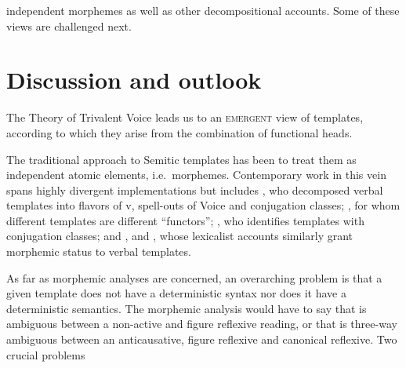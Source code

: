 \begin{exe}
\begin{xlist}
\begin{xlist}
\begin{exe}
\begin{xlist}
\begin{xlist}
\begin{exe}
\begin{xlist}
\begin{xlist}
\begin{exe}
\begin{exe}
\begin{xlist}
\begin{exe}
\begin{exe}
\begin{xlist}
\begin{exe}
\begin{exe}
\begin{exe}
\begin{exe}
\begin{exe}
\begin{xlist}
\begin{exe}
\begin{xlist}
\begin{exe}
\begin{exe}
\begin{xlist}
\begin{exe}
\begin{xlist}
\begin{exe}
\begin{xlist}
\begin{exe}
\begin{exe}
\begin{exe}
\begin{xlist}
\begin{exe}
\begin{exe}
\begin{exe}
\begin{xlist}
\begin{exe}
\begin{xlist}
\begin{exe}
\begin{xlist}
\begin{exe}
\begin{xlist}
\begin{exe}
\begin{exe}
\begin{exe}
\begin{exe}
\begin{xlist}
\begin{exe}
\begin{xlist}
\begin{exe}
\begin{xlist}
\begin{exe}
\begin{xlist}
\begin{exe}
\begin{xlist}
\begin{exe}
\begin{xlist}
\begin{exe}
\begin{exe}
\begin{exe}
\begin{exe}
\begin{xlist}
\begin{exe}
\begin{xlist}
\begin{exe}
\begin{xlist}
\begin{exe}
\begin{exe}
\begin{xlist}
\begin{exe}
\begin{xlist}
\begin{exe}
\begin{exe}
\begin{exe}
\begin{exe}
\begin{xlist}
\begin{xlist}
\begin{exe}
\begin{xlist}
\begin{exe}
\begin{exe}
\begin{exe}
\begin{xlist}
\begin{exe}
\begin{exe}
\begin{xlist}
\begin{exe}
\begin{exe}
\begin{exe}
\begin{xlist}
\begin{xlist}
\begin{exe}
\begin{xlist}
\begin{exe}
\begin{exe}
\begin{exe}
\begin{exe}
\begin{xlist}
\begin{exe}
\begin{xlist}
\begin{exe}
\begin{xlist}
\begin{exe}
\begin{xlist}
\begin{exe}
\begin{exe}
\begin{exe}
\begin{exe}
\begin{exe}
\begin{exe}
\begin{xlist}
\begin{exe}
\begin{xlist}
\begin{exe}
\begin{xlist}
\begin{exe}
\begin{xlist}
\begin{exe}
\begin{xlist}
independent morphemes as well as other decompositional accounts. Some of these views are challenged next.


\section{Discussion and outlook} \label{vz:others}
The Theory of Trivalent Voice leads us to an \textsc{emergent} view of templates, according to which they arise from the combination of functional heads.

The traditional approach to Semitic templates has been to treat them as independent atomic elements, i.e.~morphemes. Contemporary work in this vein spans highly divergent implementations but includes \cite{arad03,arad05}, who decomposed verbal templates into flavors of v, spell-outs of Voice and conjugation classes; \cite{borer13oup}, for whom different templates are different ``functors''; \cite{aronoff94,aronoff07}, who identifies templates with conjugation classes; and \cite{reinhartsiloni05}, \cite{schwarzwald08} and \cite{laks11,laks14}, whose lexicalist accounts similarly grant morphemic status to verbal templates.

As far as morphemic analyses are concerned, an overarching problem is that a given template does not have a deterministic syntax nor does it have a deterministic semantics. The morphemic analysis would have to say that {\tnif} is ambiguous between a non-active and figure reflexive reading, or that {\thit} is three-way ambiguous between an anticausative, figure reflexive and canonical reflexive. Two crucial problems 
\end{xlist}
\end{exe}
\end{xlist}
\end{exe}
\end{xlist}
\end{exe}
\end{xlist}
\end{exe}
\end{xlist}
\end{exe}
\end{exe}
\end{exe}
\end{exe}
\end{exe}
\end{exe}
\end{xlist}
\end{exe}
\end{xlist}
\end{exe}
\end{xlist}
\end{exe}
\end{xlist}
\end{exe}
\end{exe}
\end{exe}
\end{exe}
\end{xlist}
\end{exe}
\end{xlist}
\end{xlist}
\end{exe}
\end{exe}
\end{exe}
\end{xlist}
\end{exe}
\end{exe}
\end{xlist}
\end{exe}
\end{exe}
\end{exe}
\end{xlist}
\end{exe}
\end{xlist}
\end{xlist}
\end{exe}
\end{exe}
\end{exe}
\end{exe}
\end{xlist}
\end{exe}
\end{xlist}
\end{exe}
\end{exe}
\end{xlist}
\end{exe}
\end{xlist}
\end{exe}
\end{xlist}
\end{exe}
\end{exe}
\end{exe}
\end{exe}
\end{xlist}
\end{exe}
\end{xlist}
\end{exe}
\end{xlist}
\end{exe}
\end{xlist}
\end{exe}
\end{xlist}
\end{exe}
\end{xlist}
\end{exe}
\end{exe}
\end{exe}
\end{exe}
\end{xlist}
\end{exe}
\end{xlist}
\end{exe}
\end{xlist}
\end{exe}
\end{xlist}
\end{exe}
\end{exe}
\end{exe}
\end{xlist}
\end{exe}
\end{exe}
\end{exe}
\end{xlist}
\end{exe}
\end{xlist}
\end{exe}
\end{xlist}
\end{exe}
\end{exe}
\end{xlist}
\end{exe}
\end{xlist}
\end{exe}
\end{exe}
\end{exe}
\end{exe}
\end{exe}
\end{xlist}
\end{exe}
\end{exe}
\end{xlist}
\end{exe}
\end{exe}
\end{xlist}
\end{xlist}
\end{exe}
\end{xlist}
\end{xlist}
\end{exe}
\end{xlist}
\end{xlist}
\end{exe}
